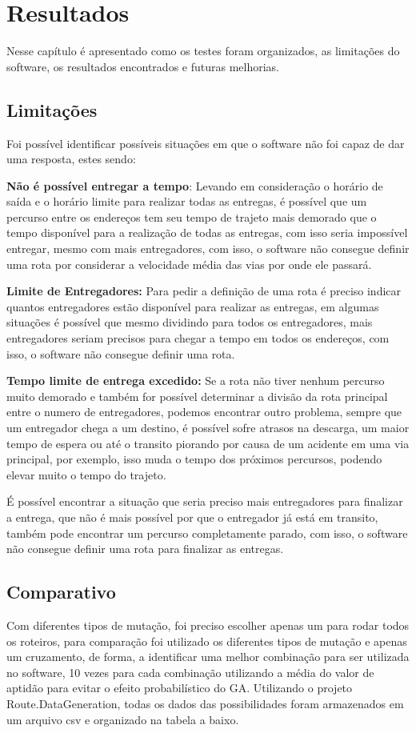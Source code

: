 \chapter{Resultados}
Nesse capítulo é apresentado como os testes foram organizados, as limitações do software, os resultados encontrados e futuras melhorias.

\section{Limitações}
Foi possível identificar possíveis situações em que o software não foi capaz de dar uma resposta, estes sendo:

\textbf{Não é possível entregar a tempo}: Levando em consideração o horário de saída e o horário limite para realizar todas as entregas, é possível que um percurso entre os endereços tem seu tempo de trajeto mais demorado que o tempo disponível para a realização de todas as entregas, com isso seria impossível entregar, mesmo com mais entregadores, com isso, o software não consegue definir uma rota por considerar a velocidade média das vias por onde ele passará.

\textbf{Limite de Entregadores:} Para pedir a definição de uma rota é preciso indicar quantos entregadores estão disponível para realizar as entregas, em algumas situações é possível que mesmo dividindo para todos os entregadores, mais entregadores seriam precisos para chegar a tempo em todos os endereços, com isso, o software não consegue definir uma rota.

\textbf{Tempo limite de entrega excedido:} Se a rota não tiver nenhum percurso muito demorado e também for possível determinar a divisão da rota principal entre o numero de entregadores, podemos encontrar outro problema, sempre que um entregador chega a um destino, é possível sofre atrasos na descarga, um maior tempo de espera ou até o transito piorando por causa de um acidente em uma via principal, por exemplo, isso muda o tempo dos próximos percursos, podendo elevar muito o tempo do trajeto.

É possível encontrar a situação que seria preciso mais entregadores para finalizar a entrega, que não é mais possível por que o entregador já está em transito, também pode encontrar um percurso completamente parado,  com isso, o software não consegue definir uma rota para finalizar as entregas.


\section{Comparativo}
Com diferentes tipos de mutação, foi preciso escolher apenas um para rodar todos os roteiros, para comparação foi utilizado os diferentes tipos de mutação e apenas um cruzamento, de forma, a identificar uma melhor combinação para ser utilizada no software, 10 vezes para cada combinação utilizando a média do valor de aptidão para evitar o efeito probabilístico do GA. Utilizando o projeto Route.DataGeneration, todas os dados das possibilidades foram armazenados em um arquivo csv e organizado na tabela a baixo. 

